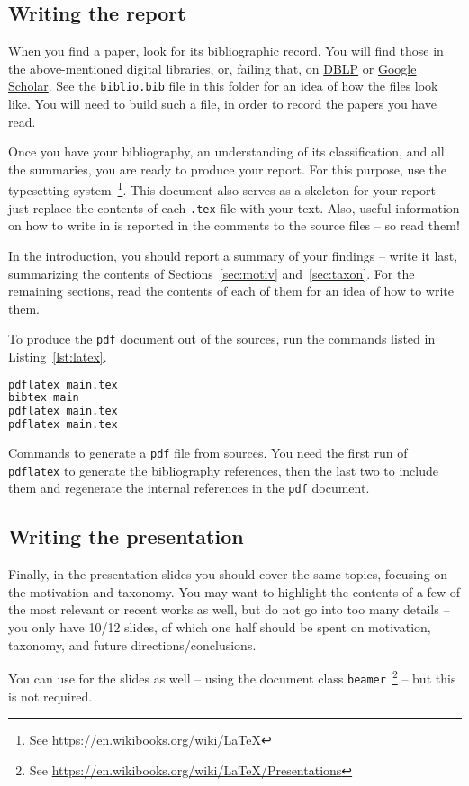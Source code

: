 \subsection{Writing the report}
When you find a paper, look for its \BibTeX bibliographic record. 
You will find those in the above-mentioned digital libraries, or, failing that, on \href{http://dblp.uni-trier.de/}{DBLP} or \href{https://scholar.google.com}{Google Scholar}.
See the \texttt{biblio.bib} file in this folder for an idea of how the \BibTeX files look like.
You will need to build such a file, in order to record the papers you have read.

Once you have your bibliography, an understanding of its classification, and all the summaries, you are ready to produce your report.
For this purpose, use the \latex typesetting system~\footnote{See \href{https://en.wikibooks.org/wiki/LaTeX}{https://en.wikibooks.org/wiki/LaTeX}}. %
This document also serves as a skeleton for your report -- just replace the contents of each \texttt{.tex} file with your text.
Also, useful information on how to write in \latex is reported in the comments to the source files -- so read them!

In the introduction, you should report a summary of your findings -- write it last, summarizing the contents of Sections~\ref{sec:motiv} and~\ref{sec:taxon}.
For the remaining sections, read the contents of each of them for an idea of how to write them.

To produce the \texttt{pdf} document out of the \latex sources, run the commands listed in Listing~\ref{lst:latex}.

\begin{listing}
\begin{lstlisting}[language=Bash]
pdflatex main.tex
bibtex main
pdflatex main.tex
pdflatex main.tex
\end{lstlisting}
\caption{\label{lst:latex}Commands to generate a \texttt{pdf} file from \latex sources. You need the first run of \texttt{pdflatex} to generate the bibliography references, then the last two to include them and regenerate the internal references in the \texttt{pdf} document.}
\end{listing}

\subsection{Writing the presentation}
Finally, in the presentation slides you should cover the same topics, focusing on the motivation and taxonomy. 
You may want to highlight the contents of a few of the most relevant or recent works as well, but do not go into too many details -- you only have 10/12 slides, of which one half should be spent on motivation, taxonomy, and future directions/conclusions.

You can use \latex for the slides as well -- using the document class \texttt{beamer}~\footnote{See \href{https://en.wikibooks.org/wiki/LaTeX/Presentations}{https://en.wikibooks.org/wiki/LaTeX/Presentations}} -- but this is not required.
